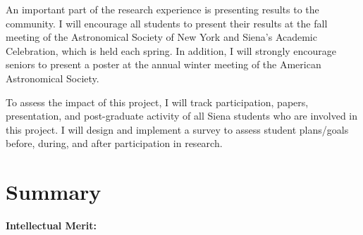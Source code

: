 \documentclass[11pt, preprint]{aastex}
\begin{document}
{An important part of the research experience is presenting results
to the community. I will encourage all students 
to present their results at the fall meeting of the 
Astronomical Society of New York and Siena's Academic Celebration, which
is held each spring.  In addition, I will strongly encourage seniors to
present a poster at the 
annual winter meeting of the American Astronomical Society.  

To assess the impact of this project, I will track participation, papers, 
presentation, and post-graduate activity of all Siena students
who are involved in this project.  I will design and implement a survey to 
assess student plans/goals before, during, and after
participation in research.

\vspace*{-.7cm}
\section{Summary}
\vspace*{-.25cm}

{\bf Intellectual Merit:} 


}
\end{document}
